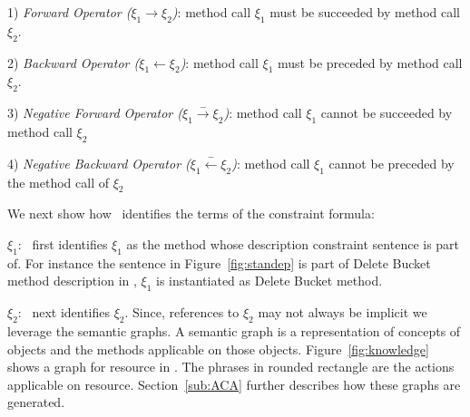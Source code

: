 %
%
%


1) \textit{Forward Operator ($\xi_1 \rightarrow \xi_2$)}: method call $\xi_1$ must be succeeded by method call $\xi_2$. 

2) \textit{Backward Operator ($\xi_1 \leftarrow \xi_2$)}: method call $\xi_1$ must be preceded by method call $\xi_2$.

3) \textit{Negative Forward Operator ($\xi_1 \xrightarrow{-} \xi_2$)}: method call $\xi_1$ cannot be succeeded by method call $\xi_2$

4) \textit{Negative Backward Operator ($\xi_1 \xleftarrow{-} \xi_2$)}: method call $\xi_1$ cannot be preceded by the method call of $\xi_2$


We next show how \tool\ identifies the terms of the constraint formula:


\textbf{$\xi_1$}:
\tool\ first identifies $\xi_1$ as the method whose description constraint sentence is part of.
For instance the sentence in Figure~\ref{fig:standep} is part of Delete Bucket method description in \amazonAPI,
$\xi_1$ is instantiated as Delete Bucket method.


\textbf{$\xi_2$}:
\tool\ next identifies $\xi_2$. Since, references to $\xi_2$ may not always be implicit we leverage the semantic graphs. A semantic graph is a representation of concepts of objects and the methods applicable on those objects. Figure~\ref{fig:knowledge} shows a graph for  resource in \amazonAPI.
The phrases in rounded rectangle are the actions applicable on  resource.
Section~\ref{sub:ACA} further describes how these graphs are generated.
  

